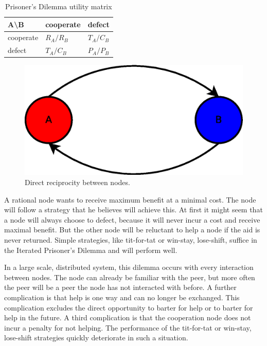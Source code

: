 \begin{table}
\center
	\begin{tabular}{l|ll}
	A\textbackslash B       & cooperate  & defect     \\ \hline
	cooperate & $R_A /R_B$ & $T_A /C_B$ \\
	defect    & $T_A /C_B$ & $P_A /P_B$
	\end{tabular}
\caption{Prisoner's Dilemma utility matrix}
\label{tab:pd-um}
\end{table}

\begin{figure}
	\centerline{\includegraphics[scale=0.3]{problemDescription/figs/direct-reciprocity.eps}}
	\caption{Direct reciprocity between nodes.}
	\label{fig:direct-reciprocity}
\end{figure}

A rational node wants to receive maximum benefit at a minimal cost.
The node will follow a strategy that he believes will achieve this.
At first it might seem that a node will always choose to defect,
because it will never incur a cost and receive maximal benefit.
But the other node will be reluctant to help a node if the aid is never returned.
Simple strategies, like tit-for-tat or win-stay, lose-shift, suffice in the Iterated Prisoner's Dilemma
and will perform well\cite{Nowak-Cooperation}.

In a large scale, distributed system, this dilemma occurs with every interaction between nodes.
The node can already be familiar with the peer,
but more often the peer will be a peer the node has not interacted with before.
A further complication is that help is one way and can no longer be exchanged.
This complication excludes the direct opportunity to barter for help 
or to barter for help in the future\cite{Lai-Incentives}.
A third complication is that the cooperation node does not incur a penalty for not helping.
The performance of the tit-for-tat or win-stay, lose-shift strategies
quickly deteriorate in such a situation.

